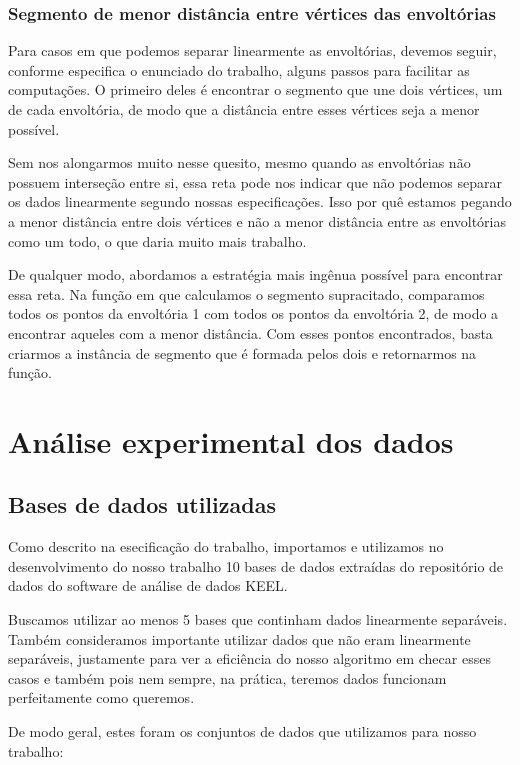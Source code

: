 \documentclass{article}
\begin{document}
\subsubsection{Segmento de menor distância entre vértices das envoltórias}

Para casos em que podemos separar linearmente as envoltórias, devemos seguir, conforme especifica o enunciado do trabalho, alguns passos para facilitar as computações. O primeiro deles é encontrar o segmento que une dois vértices, um de cada envoltória, de modo que a distância entre esses vértices seja a menor possível.

Sem nos alongarmos muito nesse quesito, mesmo quando as envoltórias não possuem interseção entre si, essa reta pode nos indicar que não podemos separar os dados linearmente segundo nossas especificações. Isso por quê estamos pegando a menor distância entre dois vértices e não a menor distância entre as envoltórias como um todo, o que daria muito mais trabalho.

De qualquer modo, abordamos a estratégia mais ingênua possível para encontrar essa reta. Na função em que calculamos o segmento supracitado, comparamos todos os pontos da envoltória 1 com todos os pontos da envoltória 2, de modo a encontrar aqueles com a menor distância. Com esses pontos encontrados, basta criarmos a instância de segmento que é formada pelos dois e retornarmos na função.

\section{Análise experimental dos dados}

\subsection{Bases de dados utilizadas}

Como descrito na esecificação do trabalho, importamos e utilizamos no desenvolvimento do nosso trabalho 10 bases de dados extraídas do repositório de dados do software de análise de dados KEEL.

Buscamos utilizar ao menos 5 bases que continham dados linearmente separáveis. Também consideramos importante utilizar dados que não eram linearmente separáveis, justamente para ver a eficiência do nosso algoritmo em checar esses casos e também pois nem sempre, na prática, teremos dados funcionam perfeitamente como queremos.

De modo geral, estes foram os conjuntos de dados que utilizamos para nosso trabalho:
\end{document}
